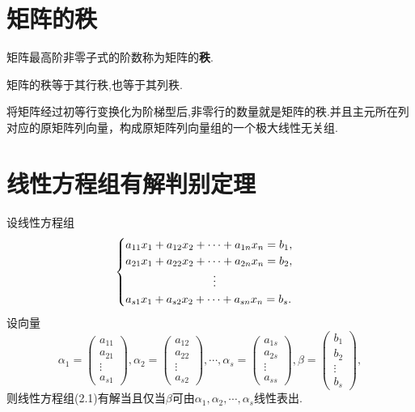 \section{矩阵的秩}
\begin{definition}
    矩阵最高阶非零子式的阶数称为矩阵的\textbf{秩}.
\end{definition}
\begin{theorem}
    矩阵的秩等于其行秩,也等于其列秩.
\end{theorem}
\begin{theorem}
    将矩阵经过初等行变换化为阶梯型后,非零行的数量就是矩阵的秩.并且主元所在列对应的原矩阵列向量，构成原矩阵列向量组的一个极大线性无关组.
\end{theorem}

\section{线性方程组有解判别定理}
设线性方程组
\begin{align}
    \begin{cases}
        a_{11}x_1 + a_{12}x_2 + \cdots + a_{1n}x_n = b_1, \\
        a_{21}x_1 + a_{22}x_2 + \cdots + a_{2n}x_n = b_2, \\
        \multicolumn{1}{c}{\vdots} \\
        a_{s1}x_1 + a_{s2}x_2 + \cdots + a_{sn}x_n = b_s.
    \end{cases}
\end{align}
设向量\begin{equation*}
    \alpha_1 =
    \begin{pmatrix}
    a_{11} \\ a_{21} \\ \vdots \\ a_{s1}
    \end{pmatrix}, 
    \alpha_2 = 
    \begin{pmatrix}a_{12} \\ a_{22} \\ \vdots \\ a_{s2}
    \end{pmatrix}, \cdots, 
    \alpha_s = 
    \begin{pmatrix}
    a_{1s} \\ a_{2s} \\ \vdots \\ a_{ss}
    \end{pmatrix}, \beta = 
    \begin{pmatrix}
    b_1 \\ b_2 \\ \vdots \\ b_s
    \end{pmatrix},
\end{equation*}则线性方程组(2.1)有解当且仅当$\beta$可由$\alpha_1, \alpha_2, \cdots, \alpha_s$线性表出.
